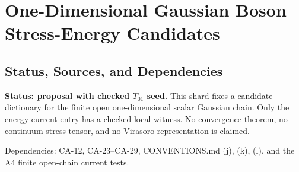 
\section{One-Dimensional Gaussian Boson Stress-Energy Candidates}
\label{sec:gaussian-boson-1d-stress-candidates}

\subsection{Status, Sources, and Dependencies}

\textbf{Status: proposal with checked \(T_{01}\) seed.}  This shard fixes a
candidate dictionary for the finite open one-dimensional scalar Gaussian chain.
Only the energy-current entry has a checked local witness.  No convergence
theorem, no continuum stress tensor, and no Virasoro representation is claimed.

Dependencies: CA-12, CA-23--CA-29, CONVENTIONS.md (j), (k), (l), and the A4
finite open-chain current tests.

